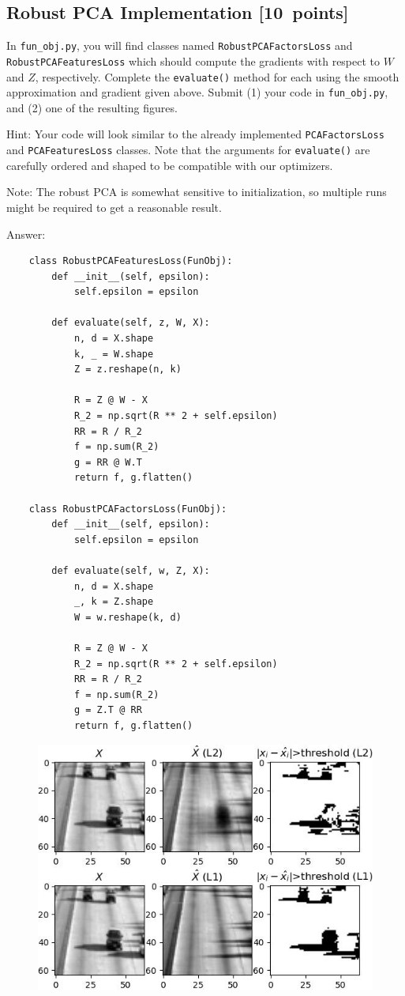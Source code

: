 \documentclass{article}
\newcommand{\blu}[1]{{\textcolor{blu}{#1}}}
\newenvironment{answer}{\par\begingroup\color{gre}Answer: }{\endgroup}
\let\ask\blu
\newcommand\pts[1]{\textcolor{pointscolour}{[#1~points]}}
\begin{document}
\subsection{Robust PCA Implementation \pts{10}}

In \texttt{fun\_obj.py}, you will find classes named \texttt{RobustPCAFactorsLoss} and \texttt{RobustPCAFeaturesLoss} which should compute the gradients with respect to $W$ and $Z$, respectively. \ask{Complete the \texttt{evaluate()} method for each using the smooth approximation and gradient given above. Submit (1) your code in \texttt{fun\_obj.py}, and (2) one of the resulting figures.}

Hint: Your code will look similar to the already implemented \texttt{PCAFactorsLoss} and \texttt{PCAFeaturesLoss} classes. Note that the arguments for \texttt{evaluate()} are carefully ordered and shaped to be compatible with our optimizers.

Note: The robust PCA is somewhat sensitive to initialization, so multiple runs might be required to get a reasonable result.
\begin{answer}
	

	\begin{verbatim}
	class RobustPCAFeaturesLoss(FunObj):
		def __init__(self, epsilon):
			self.epsilon = epsilon

		def evaluate(self, z, W, X):
			n, d = X.shape
			k, _ = W.shape
			Z = z.reshape(n, k)

			R = Z @ W - X
			R_2 = np.sqrt(R ** 2 + self.epsilon)
			RR = R / R_2
			f = np.sum(R_2) 
			g = RR @ W.T
			return f, g.flatten()

	class RobustPCAFactorsLoss(FunObj):
		def __init__(self, epsilon):
			self.epsilon = epsilon

		def evaluate(self, w, Z, X):
			n, d = X.shape
			_, k = Z.shape
			W = w.reshape(k, d)

			R = Z @ W - X
			R_2 = np.sqrt(R ** 2 + self.epsilon)
			RR = R / R_2
			f = np.sum(R_2)
			g = Z.T @ RR
			return f, g.flatten()
	\end{verbatim}

	\begin{figure}[htbp!]
		\centering
		\includegraphics[width = .7\textwidth]{figs/robustpca_highway_003.jpg}
	\end{figure}
\end{answer}
\end{document}
